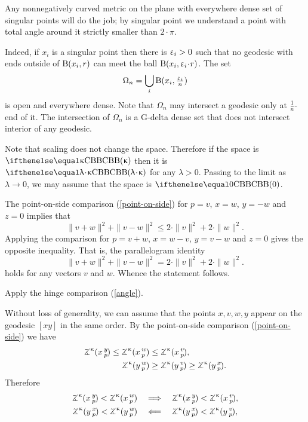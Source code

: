 
Any nonnegatively curved metric on the plane with everywhere dense set of singular points will do the job;
by singular point we understand a point with total angle around it strictly smaller than $2\cdot\pi$.

Indeed, if $x_i$ is a singular point then there is $\upvarepsilon_i>0$ such that no geodesic with ends outside of $\mathrm{B}{}(x_i,r)$ can meet the ball $\oBall(x_i,\eps_i\cdot r)$.
The set 
\[\Omega_n=\bigcup_i \mathrm{B}{}(x_i,\tfrac{\upvarepsilon_i}n)\]
is open and everywhere dense.
Note that $\Omega_n$ may intersect a geodesic only at $\tfrac1n$-end of it.
The intersection of $\Omega_n$ is a G-delta dense set that does not intersect interior of any geodesic.

Note that scaling does not change the space.
Therefore if the space is $\Alex\kappa$ then it is $\Alex{\lambda\cdot\kappa}$ for any $\lambda>0$.
Passing to the limit as $\lambda\to 0$, we may assume that the space is $\Alex0$.

The point-on-side comparison (\ref{point-on-side}) for $p=v$, $x=w$, $y=-w$ and $z=0$ implies that 
\[\|v+w\|^2+\|v-w\|^2\le 2\cdot\|v\|^2+2\cdot\|w\|^2.\]
Applying the comparison for 
$p=v+w$, $x=w-v$, $y=v-w$ and $z=0$ gives the opposite inequality.
That is, the parallelogram identity
\[\|v+w\|^2+\|v-w\|^2= 2\cdot\|v\|^2+2\cdot\|w\|^2.\]
holds for any vectors $v$ and $w$.
Whence the statement follows.

Apply the hinge comparison (\ref{angle}).

 Without loss of generality, we can assume that the points $x,v,w,y$ appear on the geodesic $[xy]$ in the same order.
By the point-on-side comparison (\ref{point-on-side}) we have
\begin{align*}
\angk\kappa xyp\le\angk\kappa xwp&\le \angk\kappa xvp,
\\
\angk\kappa ywp&\ge\angk\kappa yvp\ge\angk\kappa yxp.
\end{align*}
Therefore
\begin{align*}\angk\kappa xyp<\angk\kappa xwp
\quad&\Longrightarrow\quad
\angk\kappa xyp<\angk\kappa xvp,
\\
\angk\kappa yxp<\angk\kappa ywp
\quad&\Longleftarrow\quad
\angk\kappa yxp<\angk\kappa yvp,
\end{align*}

